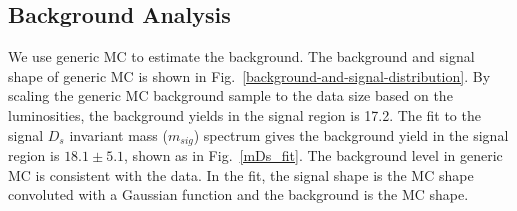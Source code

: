 \subsection{Background Analysis}
We use generic MC to estimate the background. The background and signal shape of generic MC is shown in Fig.~\ref{background-and-signal-distribution}. 
By scaling the generic MC background sample to the data size based on the luminosities, the background yields in the signal region is 17.2. 
The fit to the signal $D_{s}$ invariant mass ($m_{sig}$) spectrum gives the background yield in the signal region is $18.1 \pm 5.1$, shown as in Fig.~\ref{mDs_fit}.  
The background level in generic MC is consistent with the data. In the fit, the signal shape is the MC shape convoluted with a Gaussian function and the background is the MC shape. 



